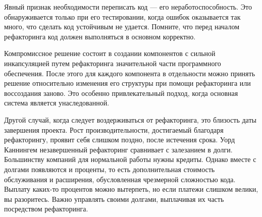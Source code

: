 \documentclass{../../text-style}
\begin{document}
Явный признак необходимости переписать код --- его неработоспособность. Это обнаруживается только при его тестировании, когда ошибок оказывается так много, что сделать код устойчивым не удается. Помните, что перед началом рефакторинга код должен выполняться в основном корректно.

Компромиссное решение состоит в создании компонентов с сильной инкапсуляцией путем рефакторинга значительной части программного обеспечения. После этого для каждого компонента в отдельности можно принять решение относительно изменения его структуры при помощи рефакторинга или воссоздания заново. Это особенно привлекательный подход, когда основная система является унаследованной.

Другой случай, когда следует воздерживаться от рефакторинга, это близость даты завершения проекта. Рост производительности, достигаемый благодаря рефакторингу, проявит себя слишком поздно, после истечения срока. Уорд Каннингем незавершенный рефакторинг сравнивает с залезанием в долги. Большинству компаний для нормальной работы нужны кредиты. Однако вместе с долгами появляются и проценты, то есть дополнительная стоимость обслуживания и расширения, обусловленная чрезмерной сложностью кода. Выплату каких-то процентов можно вытерпеть, но если платежи слишком велики, вы разоритесь. Важно управлять своими долгами, выплачивая их часть посредством рефакторинга.
\end{document}
